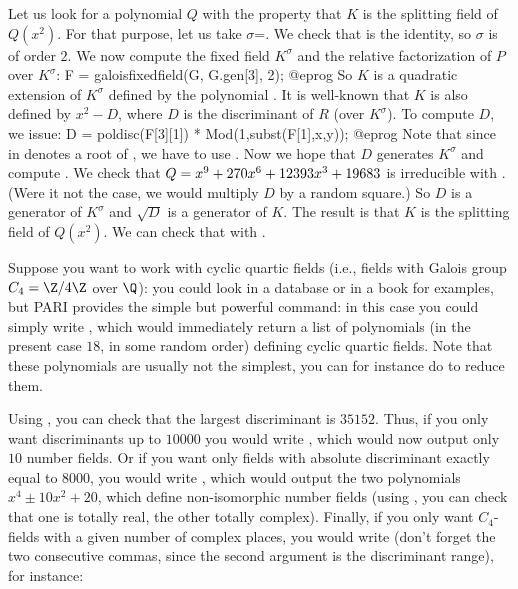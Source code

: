 Let us look for a polynomial $Q$ with the property that $K$ is the splitting
field of $Q(x^2)$. For that purpose, let us take $\sigma$=.  We
check that  is the identity, so $\sigma$ is of order $2$. We now compute the fixed field $K^\sigma$ and the relative factorization of $P$ over
$K^\sigma$:
\bprog
F = galoisfixedfield(G, G.gen[3], 2);
@eprog\noindent
So $K$ is a quadratic extension of $K^\sigma$ defined by the polynomial
. It is well-known that $K$ is also defined by $x^2-D$,
where $D$ is the discriminant of $R$ (over $K^\sigma$).
To compute $D$, we issue:
\bprog
D = poldisc(F[3][1]) * Mod(1,subst(F[1],x,y));
@eprog\noindent
Note that since  in  denotes a root of , we
have to use .  Now we hope that $D$ generates $K^\sigma$ and
compute . We check that $Q=x^9+270\*x^6+12393\*x^3+19683$ is
irreducible with . (Were it not the case, we would
multiply $D$ by a random square.) So $D$ is a generator of $K^\sigma$ and
$\sqrt{D}$ is a generator of $K$. The result is that $K$ is the splitting
field of $Q(x^2)$.  We can check that with
.


Suppose you want to work with cyclic quartic fields (i.e., fields with
Galois group $C_4=\Z/4\Z$ over $\Q$): you could look in a database or in
a book for examples, but PARI provides the simple but powerful 
command: in this case you could simply write ,
which would immediately return a list of polynomials (in the present case
$18$, in some random order) defining cyclic quartic fields. Note that these
polynomials are usually not the simplest, you can for instance do
 to reduce them.

Using , you can check that the largest
discriminant is $35152$. Thus, if you only want discriminants up to $10000$
you would write , which would now output only
$10$ number fields. Or if you want only fields with absolute discriminant
exactly equal to $8000$, you would write , which
would output the two polynomials $x^4\pm10x^2+20$, which define non-isomorphic
number fields (using , you can check that one is totally real,
the other totally complex). Finally, if you only want $C_4$-fields with a
given number  of complex places, you would write 
(don't forget the two consecutive commas, since the second argument is the
discriminant range), for instance:


